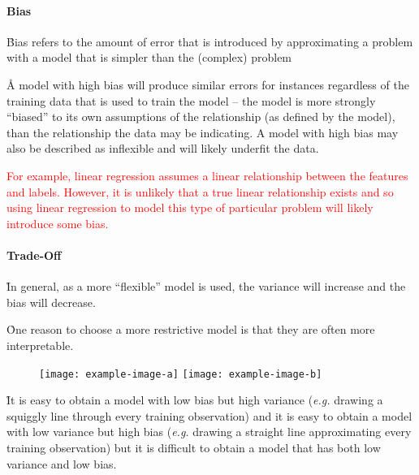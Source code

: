 \paragraph{Bias}
\r{Bias refers to the amount of error that is introduced by approximating a problem with a model that is simpler than the (complex) problem}

\r{A model with high bias will produce similar errors for instances regardless of the training data that is used to train the model -- the model is more strongly ``biased'' to its own assumptions of the relationship (as defined by the model), than the relationship the data may be indicating. A model with high bias may also be described as inflexible and will likely underfit the data.}


\textcolor{red}{For example, linear regression assumes a linear relationship between the features and labels. However, it is unlikely that a true linear relationship exists and so using linear regression to model this type of particular problem will likely introduce some bias.}

\paragraph{Trade-Off}


\r{In general, as a more ``flexible'' model is used, the variance will increase and the bias will decrease.}

\r{One reason to choose a more restrictive model is that they are often more interpretable.}

\begin{figure}[htp]
	\centering
	\texttt{[image: example-image-a]}\hfil
	\texttt{[image: example-image-b]}\hfil
	\caption{}
	\label{fig:basics_eval_tradeoff_examples}
\end{figure}


\r{It is easy to obtain a model with low bias but high variance (\emph{e.g.} drawing a squiggly line through every training observation) and it is easy to obtain a model with low variance but high bias (\emph{e.g.} drawing a straight line approximating every training observation) but it is difficult to obtain a model that has both low variance and low bias.}

